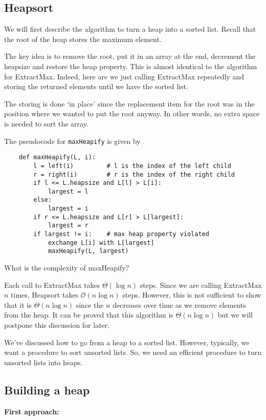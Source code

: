 \documentclass[11pt]{article}
\begin{document}
\subsection{Heapsort}
We will first describe the algorithm to turn a heap into a sorted list. Recall that the root of the heap stores the maximum element. 

The key idea is to remove the root, put it in an array at the end, decrement the heapsize and restore the heap property. This is almost identical to the algorithm for ExtractMax. Indeed, here are we just calling ExtractMax repeatedly and storing the returned elements until we have the sorted list.  

The storing is done `in place' since the replacement item for the root was in the position where we wanted to put the root anyway. In other words, no extra space is needed to sort the array. 

The pseudocode for \texttt{maxHeapify} is given by
\begin{verbatim}
    def maxHeapify(L, i): 
        l = left(i)         # l is the index of the left child
        r = right(i)        # r is the index of the right child
        if l <= L.heapsize and L[l] > L[i]: 
            largest = l 
        else: 
            largest = i 
        if r <= L.heapsize and L[r] > L[largest]:
            largest = r
        if largest != i:    # max heap property violated
            exchange L[i] with L[largest]
            maxHeapify(L, largest)
\end{verbatim}

What is the complexity of maxHeapify?

Each call to ExtractMax takes $\Theta(\log n)$ steps. Since we are calling ExtractMax $n$ times, Heapsort takes $\mathcal{O}(n \log n)$ steps. However, this is not sufficient to show that it is $\Theta(n\log n)$ since the $n$ decreases over time as we remove elements from the heap. It can be proved that this algorithm is $\Theta(n \log n)$ but we will postpone this discussion for later. %

We've discussed how to go from a heap to a sorted list. However, typically, we want a procedure to sort unsorted lists. So, we need an efficient procedure to turn unsorted lists into heaps. 

\subsection{Building a heap}
\textbf{First approach:} 
\end{document}
